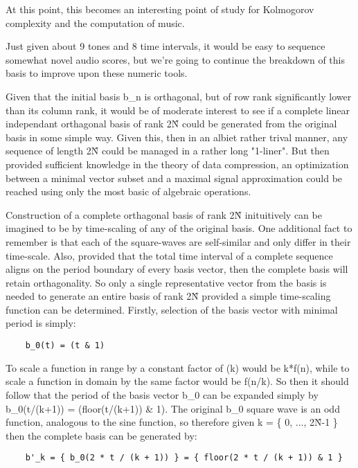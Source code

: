 \documentclass[11pt]{book}
\begin{document}
At this point, this becomes an interesting point of study for Kolmogorov complexity and the computation of music.

Just given about 9 tones and 8 time intervals, it would be easy to sequence somewhat novel audio scores, but we're going to continue
the breakdown of this basis to improve upon these numeric tools.

Given that the initial basis b\_n is orthagonal, but of row rank significantly lower than its column rank, it would be of moderate interest
to see if a complete linear independant orthagonal basis of rank 2\^N could be generated from the original basis in some simple way. Given this,
then in an albiet rather trival manner, any sequence of length 2\^N could be managed in a rather long "1-liner". But then provided sufficient
knowledge in the theory of data compression, an optimization between a minimal vector subset and a maximal signal approximation could be reached
using only the most basic of algebraic operations.

Construction of a complete orthagonal basis of rank 2\^N inituitively can be imagined to be by time-scaling of any of the original basis. One
additional fact to remember is that each of the square-waves are self-similar and only differ in their time-scale. Also, provided that the total
time interval of a complete sequence aligns on the period boundary of every basis vector, then the complete basis will retain orthagonality.
So only a single representative vector from the basis is needed to generate an entire basis of rank 2\^N provided a simple time-scaling function
can be determined. Firstly, selection of the basis vector with minimal period is simply:

\begin{verbatim}
	b_0(t) = (t & 1)
\end{verbatim}

To scale a function in range by a constant factor of (k) would be k*f(n), while to scale a function in domain by the same factor would be f(n/k).
So then it should follow that the period of the basis vector b\_0 can be expanded simply by b\_0(t/(k+1)) = (floor(t/(k+1)) \& 1). The original b\_0 square
wave is an odd function, analogous to the sine function, so therefore given k = \{ 0, ..., 2\^N-1 \} then the complete basis can be generated by:

\begin{verbatim}
	b'_k = { b_0(2 * t / (k + 1)) } = { floor(2 * t / (k + 1)) & 1 }
\end{verbatim}
\end{document}
